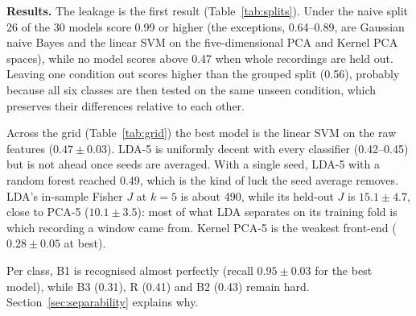 \begin{table}[t]
  \centering
  \caption{Best model under each split (macro-F1, mean $\pm$ std over 5 seeds). The
  leave-one-condition-out folds do not depend on the seed.}
  \label{tab:splits}
  
\end{table}

\begin{table}[t]
  \centering
  \caption{Grouped cross-validation: macro-F1 of every front-end and classifier (mean
  $\pm$ std over 5 seeds; chance 0.17). Bold: best.}
  \label{tab:grid}
  
\end{table}

\textbf{Results.} The leakage is the first result (Table~\ref{tab:splits}). Under the naive split
26 of the 30 models score 0.99 or higher (the exceptions, 0.64--0.89, are Gaussian naive
Bayes and the linear SVM on the five-dimensional PCA and Kernel PCA spaces), while no model scores above 0.47 when whole
recordings are held out. Leaving one
condition out scores higher than the grouped split (0.56), probably because all six classes
are then tested on the same unseen condition, which preserves their differences relative to
each other.

Across the grid (Table~\ref{tab:grid}) the best model is the linear SVM on the raw features
($0.47 \pm 0.03$). LDA-5 is uniformly decent with every classifier (0.42--0.45) but is not ahead
once seeds are averaged. With a single seed, LDA-5 with a random forest reached 0.49, which is
the kind of luck the seed average removes. LDA's in-sample Fisher $J$ at $k=5$ is about 490,
while its held-out $J$ is $15.1 \pm 4.7$, close to PCA-5 ($10.1 \pm 3.5$): most of what LDA
separates on its training fold is which recording a window came from. Kernel PCA-5 is the
weakest front-end ($0.28 \pm 0.05$ at best).

Per class, B1 is recognised almost perfectly (recall $0.95 \pm 0.03$ for the best model),
while B3 (0.31), R (0.41) and B2 (0.43) remain hard. Section~\ref{sec:separability} explains why.
